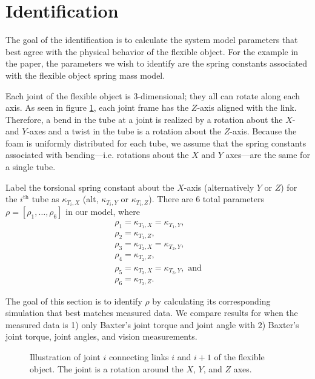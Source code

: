 \documentclass[runningheads,a4paper]{llncs}
\begin{document}
\section{Identification}
\label{sec-id}
The goal of the identification is to calculate the system model parameters that best agree with the physical behavior of the flexible object. For the example in the paper, the parameters we wish to identify are the spring constants associated with the flexible object spring mass model. 

Each joint of the flexible object is 3-dimensional; they all can rotate along each axis. As seen in figure \ref{fig-tube_link}, each joint frame has the $Z$-axis aligned with the link. Therefore, a bend in the tube at a joint is realized by a rotation about the $X$- and $Y$-axes and a twist in the tube is a rotation about the $Z$-axis. Because the foam is uniformly distributed for each tube, we assume that the spring constants associated with bending---i.e. rotations about the $X$ and $Y$ axes---are the same for a single tube. 

Label the torsional spring constant about the $X$-axis (alternatively $Y$ or $Z$) for the $i^{\textrm{th}}$ tube as $\kappa_{T_i,X}$ (alt, $\kappa_{T_i,Y}$ or $\kappa_{T_i,Z}$). There are 6 total parameters $\rho = [\rho_1,\ldots,\rho_6]$ in our model, where 
\begin{equation}
\begin{array}{l}
\rho_1 = \kappa_{T_1,X} = \kappa_{T_1,Y}, \\
\rho_2 = \kappa_{T_1,Z}, \\
\rho_3 = \kappa_{T_2,X} = \kappa_{T_2,Y}, \\
\rho_4 = \kappa_{T_2,Z} , \\
\rho_5 = \kappa_{T_3,X} = \kappa_{T_3,Y}, \textrm{ and} \\
\rho_6 = \kappa_{T_3,Z}. 
\end{array}
\label{eq-params}
\end{equation}

The goal of this section is to identify $\rho$ by calculating its corresponding simulation that best matches measured data.  We compare results for when the measured data is 1) only Baxter's joint torque and joint angle with 2) Baxter's joint torque, joint angles, and vision measurements.

\begin{figure}[!htb]
\centering
\def\svgwidth{.80\textwidth}%

\caption{Illustration of joint $i$ connecting links $i$ and $i+1$ of the flexible object.  The joint is a rotation around the $X$, $Y$, and $Z$ axes.}
\label{fig-tube_link}
\end{figure}
\end{document}
